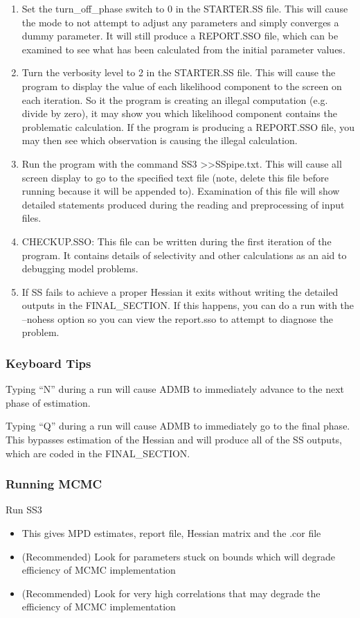 \begin{enumerate}
	\item Set the turn\_off\_phase switch to 0 in the STARTER.SS file.  This will cause the mode to not attempt to adjust any parameters and simply converges a dummy parameter.  It will still produce a REPORT.SSO file, which can be examined to see what has been calculated from the initial parameter values.
	\item Turn the verbosity level to 2 in the STARTER.SS file.  This will cause the program to display the value of each likelihood component to the screen on each iteration.  So it the program is creating an illegal computation (e.g. divide by zero), it may show you which likelihood component contains the problematic calculation.  If the program is producing a REPORT.SSO file, you may then see which observation is causing the illegal calculation.
	\item Run the program with the command SS3 >>SSpipe.txt.  This will cause all screen display to go to the specified text file (note, delete this file before running because it will be appended to).  Examination of this file will show detailed statements produced during the reading and preprocessing of input files.
	\item CHECKUP.SSO:  This file can be written during the first iteration of the program.  It contains details of selectivity and other calculations as an aid to debugging model problems. 
	\item If SS fails to achieve a proper Hessian it exits without writing the detailed outputs in the FINAL\_SECTION.  If this happens, you can do a run with the –nohess option so you can view the report.sso to attempt to diagnose the problem.
\end{enumerate}

\subsubsection{Keyboard Tips}
Typing “N” during a run will cause ADMB to immediately advance to the next phase of estimation.

Typing “Q”  during a run will cause ADMB to immediately go to the final phase.  This bypasses estimation of the Hessian and will produce all of the SS outputs, which are coded in the FINAL\_SECTION.

\subsubsection{Running MCMC}
 Run SS3
 \begin{itemize}
 	\item This gives MPD estimates, report file, Hessian matrix and the .cor file
 	\item (Recommended) Look for parameters stuck on bounds which will degrade efficiency of MCMC implementation
 	\item (Recommended) Look for very high correlations that may degrade the efficiency of MCMC implementation
 \end{itemize}
 

